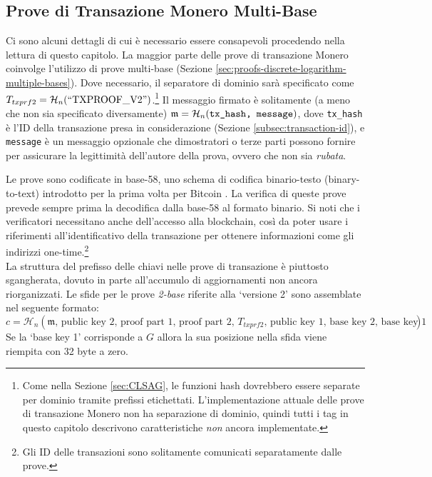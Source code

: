 \subsection{Prove di Transazione Monero Multi-Base}
\label{subsec:proofs-multi-base-monero}

Ci sono alcuni dettagli di cui è necessario essere consapevoli procedendo nella lettura di questo capitolo. La maggior parte delle prove di transazione Monero coinvolge l'utilizzo di prove multi-base (Sezione \ref{sec:proofs-discrete-logarithm-multiple-bases}). Dove necessario, il separatore di dominio sarà specificato come $T_{txprf2} = \mathcal{H}_n(``\textrm{TXPROOF\_V2}")$.\footnote{Come nella Sezione \ref{sec:CLSAG}, le funzioni hash dovrebbero essere separate per dominio tramite prefissi etichettati. L’implementazione attuale delle prove di transazione Monero non ha separazione di dominio, quindi tutti i tag in questo capitolo descrivono caratteristiche {\em non} ancora implementate.} Il messaggio firmato è solitamente (a meno che non sia specificato diversamente) $\mathfrak{m} = \mathcal{H}_n(\texttt{tx\_hash, \texttt{message}})$, dove {\tt tx\_hash} è l’ID della transazione presa in considerazione (Sezione \ref{subsec:transaction-id}), e {\tt message} è un messaggio opzionale che dimostratori o terze parti possono fornire per assicurare la legittimità dell'autore della prova, ovvero che non sia \emph{rubata}.

Le prove sono codificate in base-58, uno schema di codifica binario-testo (binary-to-text) introdotto per la prima volta per Bitcoin \cite{base-58-encoding}. La verifica di queste prove prevede sempre prima la decodifica dalla base-58 al formato binario. Si noti che i verificatori necessitano anche dell’accesso alla blockchain, così da poter usare i riferimenti all’identificativo della transazione per ottenere informazioni come gli indirizzi one-time.\footnote{Gli ID delle transazioni sono solitamente comunicati separatamente dalle prove.}
\\

La struttura del prefisso delle chiavi nelle prove di transazione è piuttosto sgangherata, dovuto in parte all’accumulo di aggiornamenti non ancora riorganizzati. Le sfide per le prove \emph{2-base} riferite alla `versione 2' sono assemblate nel seguente formato:\vspace{.175cm}
\[c = \mathcal{H}_n(\mathfrak{m}\textrm{, public key 2, proof part 1, proof part 2, $T_{txprf2}$, public key 1, base key 2, base key 1})\]
Se la `base key 1' corrisponde a $G$ allora la sua posizione nella sfida viene riempita con 32 byte a zero.


